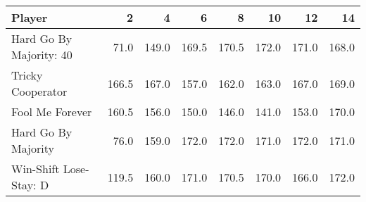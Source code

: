 \begin{tabular}{lrrrrrrr}
\toprule
                  Player &      2 &      4 &      6 &      8 &     10 &     12 &     14 \\
\midrule
 Hard Go By Majority: 40 &   71.0 &  149.0 &  169.5 &  170.5 &  172.0 &  171.0 &  168.0 \\
       Tricky Cooperator &  166.5 &  167.0 &  157.0 &  162.0 &  163.0 &  167.0 &  169.0 \\
         Fool Me Forever &  160.5 &  156.0 &  150.0 &  146.0 &  141.0 &  153.0 &  170.0 \\
     Hard Go By Majority &   76.0 &  159.0 &  172.0 &  172.0 &  171.0 &  172.0 &  171.0 \\
  Win-Shift Lose-Stay: D &  119.5 &  160.0 &  171.0 &  170.5 &  170.0 &  166.0 &  172.0 \\
\bottomrule
\end{tabular}
